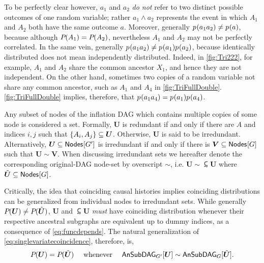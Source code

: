  
To be perfectly clear however, $a_1$ and $a_2$ \emph{do not} refer to two distinct possible outcomes of one random variable; rather $a_1\land a_2$  represents the event in which $A_1$ and $A_2$ both have the same outcome $a$. Moreover, generally $\p{a_1 a_2}\neq \p{a}$, because although $\pdf{A_1}=\pdf{A_2}$, nevertheless $A_1$ and $A_2$ may not be perfectly correlated. In the same vein, generally $\p{a_1 a_2}\neq \p{a_1}\p{a_2}$, because identically distributed does not mean independently distributed. Indeed, in \cref{fig:Tri222}, for example, $A_1$ and $A_2$ share the common ancestor $X_1$, and hence they are not independent. On the other hand, sometimes two copies of a random variable not share any common ancestor, such as $A_1$ and $A_4$ in \cref{fig:TriFullDouble}. \cref{fig:TriFullDouble} implies, therefore, that $\p{a_1 a_4}=\p{a_1}\p{a_4}$. 

Any subset of nodes of the inflation DAG which contains multiple copies of some node is considered a  set. Formally, $\bm{U}$ is redundant if and only if there are $A$ and indices $i,j$ such that $\brackets{A_i,A_j}\subseteq\bm{U}$. Otherwise, $\bm{U}$ is said to be irredundant. Alternatively, $\bm{U}\subseteq\nodes{G'}$ is irredundant if and only if there is $\bm{V}\subseteq\nodes{G}$ such that $\bm{U}\sim\bm{V}$. 
When discussing irredundant sets we hereafter denote the corresponding original-DAG node-set by overscript $\sim$, i.e.
$\bm{U}\sim\subsim{\bm{U}}$ where $\subsim{\bm{U}}\subseteq\nodes{G}$. 

Critically, the idea that coinciding causal histories implies coinciding distributions can be generalized from individual nodes to irredundant sets. While generally $\pdf{\bm{U}}\neq\pdf{\subsim{\bm{U}}}$,  $\bm{U}$ and $\subsim{\bm{U}}$ \emph{must} have coinciding distribution whenever their respective ancestral subgraphs are equivalent up to dummy indices, as a consequence of  \cref{eq:funcdepends}.
The natural generalization of \cref{eq:singlevariatecoincidence}, therefore, is,
\begin{align}\label{eq:coincidingdistrodef}
\pdf{\bm{U}}=\pdf{\subsim{\bm{U}}} \quad\text{ whenever }\quad\ansubgraph[G']{\bm{U}}\sim\ansubgraph[G]{\subsim{\bm{U}}}.
\end{align}

